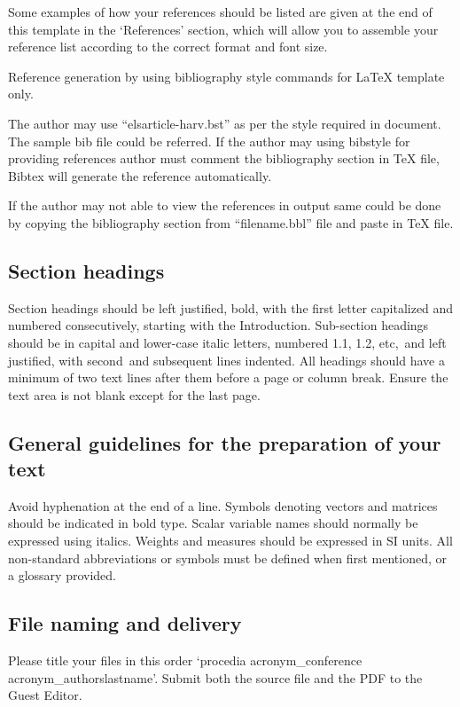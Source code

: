 \documentclass[5p,times,procedia]{elsarticle}
\begin{document}
Some examples of how your references should be listed are given at the end of this template in the `References' section, which will allow you to assemble your reference list according to the correct format and font size.

Reference generation by using bibliography style commands for LaTeX template only.

The author may use ``elsarticle-harv.bst'' as per the style required in document. The sample bib file could be referred. 
If the author may using bibstyle for providing references author must comment the bibliography section in TeX file, Bibtex will generate the reference automatically.

If the author may not able to view the references in output same could be done by copying the bibliography section from ``filename.bbl'' file and paste in TeX file.



\subsection{Section headings}
Section headings should be left justified, bold, with the first letter capitalized and numbered consecutively, starting with the Introduction. Sub-section headings should be in capital and lower-case italic letters, numbered 1.1, 1.2, etc,~and left justified, with second~and subsequent lines indented. All headings should have a minimum of two text lines after them before a page or column break.
Ensure the text area is not blank except for the last page.

\subsection{General guidelines for the preparation of your text}
Avoid hyphenation at the end of a line. Symbols denoting vectors and matrices should be indicated in bold type. Scalar variable names should normally be expressed using italics. Weights and measures should be expressed in SI units. All non-standard abbreviations or symbols must be defined when first mentioned, or a glossary provided.

\subsection{File naming and delivery}
Please title your files in this order `procedia acronym\_conference acronym\_authorslastname'.  Submit both the source file and the PDF to the Guest Editor.
\end{document}
